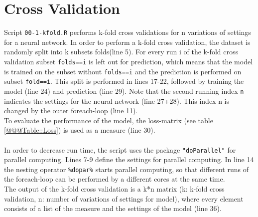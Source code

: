 \documentclass[10pt,a4paper]{article}
\begin{document}
\section{Cross Validation}


Script \texttt{00-1-kfold.R} performs k-fold cross validations for n variations of settings for a neural network. In order to perform a k-fold cross validation, the dataset is randomly split into k subsets folds(line 5). For every run i of the k-fold cross validation subset \texttt{folds==i} is left out for prediction, which means that the model is trained on the subset without \texttt{folds==i} and the prediction is performed on subset \texttt{fold==i}. This split is performed in lines 17-22, followed by training the model (line 24) and prediction (line 29). Note that the second running index \texttt{n} indicates the settings for the neural network (line 27+28). This index n is changed by the outer foreach-loop (line 11). \\
To evaluate the performance of the model, the loss-matrix (see table \ref{@@@Table::Loss}) is used as a measure (line 30). \\
\\
In order to decrease run time, the script uses the package \texttt{"doParallel"} for parallel computing. Lines 7-9 define the settings for parallel computing. In line 14 the nesting operator \texttt{\%dopar\%} starts parallel computing, so that different runs of the foreach-loop can be performed by a different cores at the same time.\\ 
The output of the k-fold cross validation is a k*n matrix (k: k-fold cross validation, n: number of variations of settings for model), where every element consists of a list  of the measure and the settings of the model (line 36). \\
\end{document}
